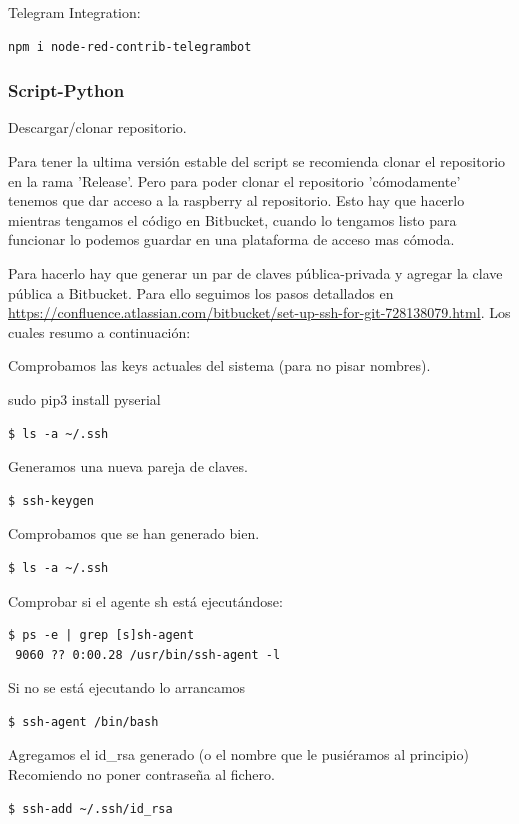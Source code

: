 \documentclass[12pt, a4paper, oneside, titlepage]{article}
\begin{document}
Telegram Integration:
\begin{lstlisting}[frame=single]
npm i node-red-contrib-telegrambot
\end{lstlisting}

\subsubsection{Script-Python}

Descargar/clonar repositorio.

Para tener la ultima versión estable del script se recomienda clonar el repositorio en la rama 'Release'. 
Pero para poder clonar el repositorio 'cómodamente' tenemos que dar acceso a la raspberry al repositorio. Esto hay que hacerlo mientras tengamos el código en Bitbucket, cuando lo tengamos listo para funcionar lo podemos guardar en una plataforma de acceso mas cómoda.

Para hacerlo hay que generar un par de claves pública-privada y agregar la clave pública a Bitbucket. Para ello seguimos los pasos detallados en \url{https://confluence.atlassian.com/bitbucket/set-up-ssh-for-git-728138079.html}. Los cuales resumo a continuación:

Comprobamos las keys actuales del sistema (para no pisar nombres).


sudo pip3 install pyserial

\begin{lstlisting}
$ ls -a ~/.ssh
\end{lstlisting}
Generamos una nueva pareja de claves.

\begin{lstlisting}
$ ssh-keygen 
\end{lstlisting}

Comprobamos que se han generado bien.
\begin{lstlisting}
$ ls -a ~/.ssh
\end{lstlisting}

Comprobar si el agente sh está ejecutándose:
\begin{lstlisting}
$ ps -e | grep [s]sh-agent
 9060 ?? 0:00.28 /usr/bin/ssh-agent -l
\end{lstlisting}

Si no se está ejecutando lo arrancamos
\begin{lstlisting}
$ ssh-agent /bin/bash
\end{lstlisting}

Agregamos el id\_rsa generado (o el nombre que le pusiéramos al principio)
Recomiendo no poner contraseña al fichero.
\begin{lstlisting}
$ ssh-add ~/.ssh/id_rsa
\end{lstlisting}
\end{document}
